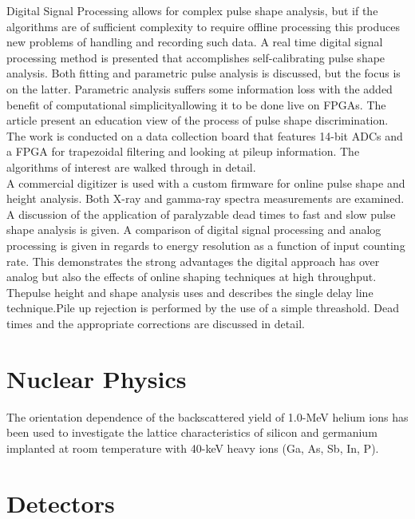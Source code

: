 \documentclass[12pt]{article}
\begin{document}
{\large\textbf{\cite{Suarez2008276}}}
Digital Signal Processing allows for complex pulse shape analysis, but if the algorithms are of sufficient complexity to require offline processing this produces new problems of handling and recording such data. A real time digital signal processing method is presented that accomplishes self-calibrating pulse shape analysis. Both fitting and parametric pulse analysis is discussed, but the focus is on the latter. Parametric analysis suffers some information loss with the added benefit of computational simplicityallowing it to be done live on FPGAs.
The article present an education view of the process of pulse shape discrimination. The work is conducted on a data collection board that features 14-bit ADCs and a FPGA for trapezoidal filtering and looking at pileup information. The algorithms of interest are walked through in detail.
\\[20pt]


{\large\textbf{\cite{Abbene2013124}}}
A commercial digitizer is used with a custom firmware for online pulse shape and height analysis. Both X-ray and gamma-ray spectra measurements are examined. A discussion of the application of paralyzable dead times to fast and slow pulse shape analysis is given. A comparison of digital signal processing and analog processing is given in regards to energy resolution as a function of input counting rate. This demonstrates the strong advantages the digital approach has over analog but also the effects of online shaping techniques at high throughput.
Thepulse height and shape analysis uses and describes the single delay line technique.Pile up rejection is performed by the use of a simple threashold. Dead times and the appropriate corrections are discussed in detail.
\\[20pt]


\section{Nuclear Physics}   %

{\large\textbf{\cite{Mayer}}}

The orientation dependence of the backscattered yield of 1.0-MeV helium ions has been used to investigate the lattice characteristics of silicon and germanium implanted at room temperature with 40-keV heavy ions (Ga, As, Sb, In, P). 
\\[20pt]


\section{Detectors}   %
\end{document}
